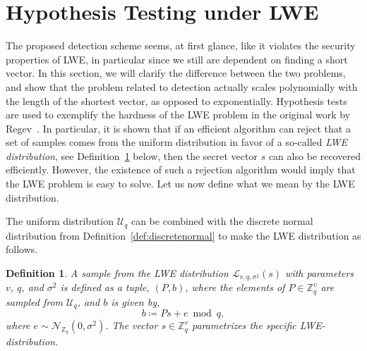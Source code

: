\documentclass[journal, twoside, web]{ieeecolorpreprint}
\newtheorem{defi}{Definition}
\newtheorem{rem}{Remark}
\begin{document}

\section{Hypothesis Testing under LWE}\label{sec:hyptest}
The proposed detection scheme seems, at first glance, like it violates the security properties of LWE, in particular since we still are dependent on finding a short vector. In this section, we will clarify the difference between the two problems, and show that the problem related to detection actually scales polynomially with the length of the shortest vector, as opposed to exponentially. Hypothesis tests are used to exemplify the hardness of the LWE problem in the original work by Regev~\cite{regev2009}. In particular, it is shown that if an efficient algorithm can reject that a set of samples comes from the uniform distribution in favor of a so-called \emph{LWE distribution}, see Definition~\ref{def:lwedist} below, then the secret vector $s$ can also be recovered efficiently. However, the existence of such a rejection algorithm would imply that the LWE problem is easy to solve. Let us now define what we mean by the LWE distribution.

The uniform distribution $\mathcal{U}_q$ can be combined with the discrete normal distribution from Definition~\ref{def:discretenormal} to make the LWE distribution as follows.
\begin{defi} \label{def:lwedist}
A sample from the LWE distribution $\mathcal{L}_{v,q,\sigma^2}(s)$ with parameters $v$, $q$, and $\sigma^2$ is defined as a tuple, $(P,b)$, where the elements of $P \in \mathbb Z_q^{v}$ are sampled from $\mathcal{U}_q$, and $b$ is given by,
\begin{equation*}
    b \coloneqq Ps+e \bmod q,
\end{equation*}
where $e \sim \mathcal{N}_{\mathbb{Z}_q}(0,\sigma^2)$. The vector $s \in \mathbb Z_q^v$ parametrizes the specific LWE-distribution.
\end{defi}
\end{document}
